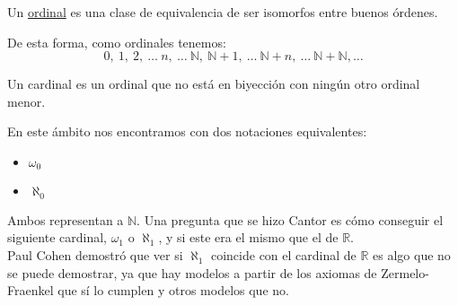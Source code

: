 \begin{definicion}[Ordinal]
    Un \underline{ordinal} es una clase de equivalencia de ser isomorfos entre buenos órdenes.
\end{definicion}
De esta forma, como ordinales tenemos:
\begin{equation*}
    0,\ 1,\ 2,\ \ldots\ n,\ \ldots \ \mathbb{N},\ \mathbb{N}+1,\ \ldots \ \mathbb{N}+n,\ \ldots \ \mathbb{N}+\mathbb{N}, \ldots 
\end{equation*}

\begin{definicion}[Cardinal]
    Un cardinal es un ordinal que no está en biyección con ningún otro ordinal menor.
\end{definicion}

\begin{notacion}
    En este ámbito nos encontramos con dos notaciones equivalentes:
    \begin{itemize}
        \item $\omega_0$
        \item $\aleph_0$
    \end{itemize}
    Ambos representan a $\mathbb{N}$. Una pregunta que se hizo Cantor es cómo conseguir el siguiente cardinal, $\omega_1$ o $\aleph_1$, y si este era el mismo que el de $\mathbb{R}$.\\

    \noindent
    Paul Cohen demostró que ver si $\aleph_1$ coincide con el cardinal de $\mathbb{R}$ es algo que no se puede demostrar, ya que hay modelos a partir de los axiomas de Zermelo-Fraenkel que sí lo cumplen y otros modelos que no.
\end{notacion}
